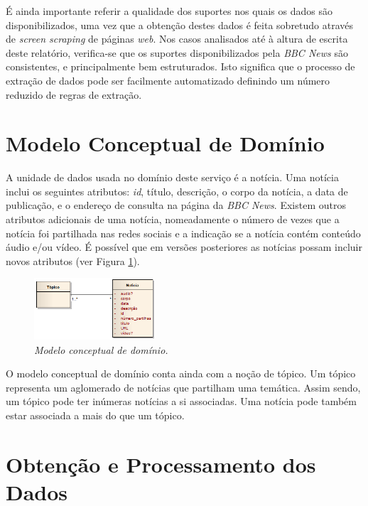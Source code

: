 \documentclass[twocolumn,twoside,10pt,a4paper]{article}
\begin{document}
É ainda importante referir a qualidade dos suportes nos quais os dados são disponibilizados, uma vez que a obtenção destes dados é feita sobretudo através de \textit{screen scraping} de páginas \textit{web}. Nos casos analisados até à altura de escrita deste relatório, verifica-se que os suportes disponibilizados pela \textit{BBC News} são consistentes, e principalmente bem estruturados. Isto significa que o processo de extração de dados pode ser facilmente automatizado definindo um número reduzido de regras de extração.

\section{Modelo Conceptual de Domínio}\label{sec:model}

A unidade de dados usada no domínio deste serviço é a notícia. Uma notícia inclui os seguintes atributos: \textit{id}, título, descrição, o corpo da notícia, a data de publicação, e o endereço de consulta na página da \textit{BBC News}. Existem outros atributos adicionais de uma notícia, nomeadamente o número de vezes que a notícia foi partilhada nas redes sociais e a indicação se a notícia contém conteúdo áudio e/ou vídeo. É possível que em versões posteriores as notícias possam incluir novos atributos (ver Figura \ref{fig:domain}).

\begin{figure}[ht]
\centerline{\includegraphics[width=0.4\textwidth]{domain.png}}
\caption{{\it Modelo conceptual de domínio.}}
\label{fig:domain}
\end{figure}

O modelo conceptual de domínio conta ainda com a noção de tópico. Um tópico representa um aglomerado de notícias que partilham uma temática. Assim sendo, um tópico pode ter inúmeras notícias a si associadas. Uma notícia pode também estar associada a mais do que um tópico.

\section{Obtenção e Processamento dos Dados}\label{sec:processing}
\end{document}
